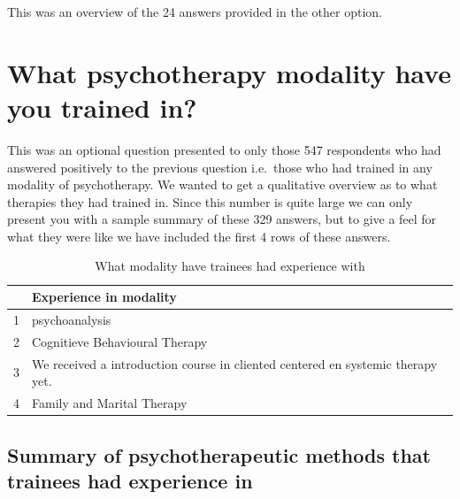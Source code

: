 \documentclass[]{tufte-handout}
\begin{document}
This was an overview of the 24 answers provided in the other option.

\section{What psychotherapy modality have you trained
in?}\label{what-psychotherapy-modality-have-you-trained-in}

This was an optional question presented to only those 547 respondents
who had answered positively to the previous question i.e.~those who had
trained in any modality of psychotherapy. We wanted to get a qualitative
overview as to what therapies they had trained in. Since this number is
quite large we can only present you with a sample summary of these 329
answers, but to give a feel for what they were like we have included the
first 4 rows of these answers.

\begin{table}[!h]
\centering
\begin{tabular}{lp{3.5in}}
  \toprule
 & Experience in modality \\ 
  \midrule
1 & psychoanalysis \\ 
  2 & Cognitieve Behavioural Therapy \\ 
  3 & We received a introduction course in cliented centered en systemic therapy yet. \\ 
  4 & Family and Marital Therapy \\ 
   \bottomrule
\end{tabular}
\caption{What modality have trainees had experience with} 
\end{table}

\subsection{Summary of psychotherapeutic methods that trainees had
experience
in}\label{summary-of-psychotherapeutic-methods-that-trainees-had-experience-in}
\end{document}
